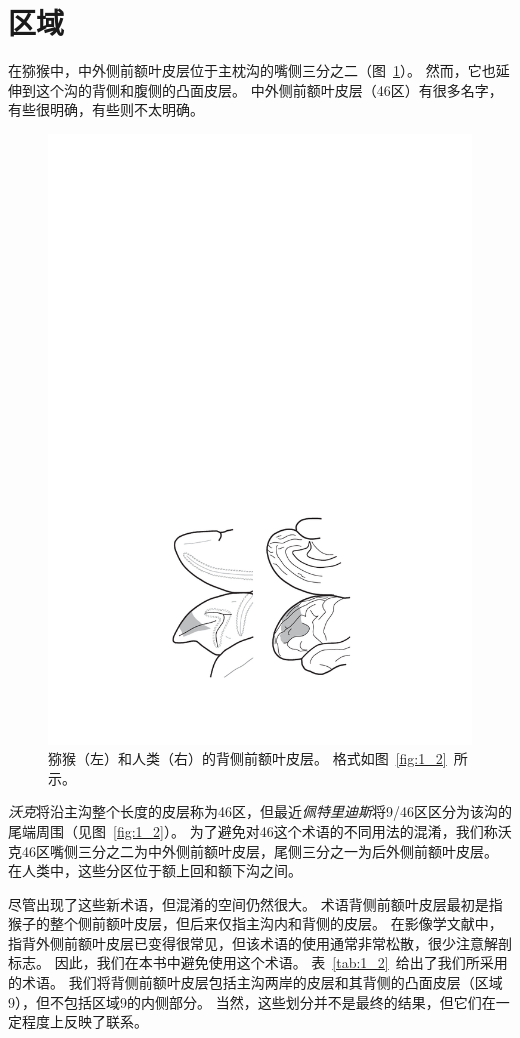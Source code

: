 \section{区域}

在猕猴中，中外侧前额叶皮层位于主枕沟的嘴侧三分之二（图~\ref{fig:6_1}）。
然而，它也延伸到这个沟的背侧和腹侧的凸面皮层。
中外侧前额叶皮层（46区）有很多名字，有些很明确，有些则不太明确。


\begin{figure}
	\centering
	\includegraphics[width=0.7\linewidth]{chap6/6_1}
	\caption{猕猴（左）和人类（右）的背侧前额叶皮层。
		格式如图~\ref{fig:1_2}~所示。}
	\label{fig:6_1}
\end{figure}


\textit{沃克}将沿主沟整个长度的皮层称为46区\cite{walker1940cytoarchitectural}，但最近\textit{佩特里迪斯}将9/46区区分为该沟的尾端周围（见图~\ref{fig:1_2}）\cite{petrides1999dorsolateral}。
为了避免对46这个术语的不同用法的混淆，我们称沃克46区嘴侧三分之二为中外侧前额叶皮层，尾侧三分之一为后外侧前额叶皮层。
在人类中，这些分区位于额上回和额下沟之间。


尽管出现了这些新术语，但混淆的空间仍然很大。
术语背侧前额叶皮层最初是指猴子的整个侧前额叶皮层\cite{pribram1952effects}，但后来仅指主沟内和背侧的皮层\cite{mishkin1969re}。
在影像学文献中，指背外侧前额叶皮层已变得很常见，但该术语的使用通常非常松散，很少注意解剖标志。
因此，我们在本书中避免使用这个术语。
表~\ref{tab:1_2}~给出了我们所采用的术语。
我们将背侧前额叶皮层包括主沟两岸的皮层和其背侧的凸面皮层（区域9），但不包括区域9的内侧部分。
当然，这些划分并不是最终的结果，但它们在一定程度上反映了联系。



